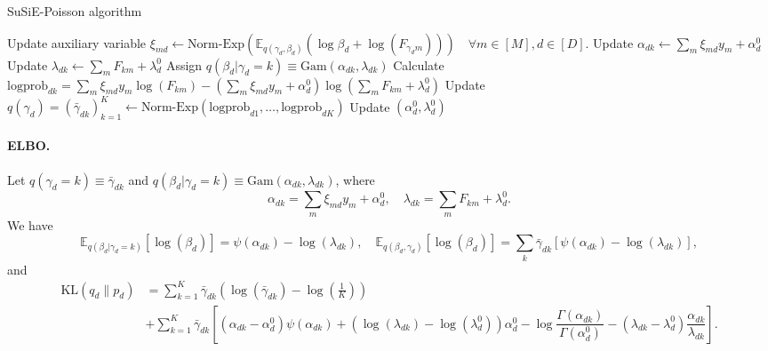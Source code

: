 \documentclass[11pt,twoside]{article}
\newcommand{\Ebb}{\ensuremath{\mathbb{E}}}
\theoremstyle{plain}
\numberwithin{theorem}{section}
\numberwithin{proposition}{section}
\numberwithin{lemma}{section}
\numberwithin{definition}{section}
\numberwithin{condition}{section}
\numberwithin{problem}{section}
\numberwithin{corollary}{section}
\numberwithin{assumption}{section}
\numberwithin{example}{section}
\numberwithin{conjecture}{section}
\theoremstyle{definition}
\numberwithin{remark}{section}
\begin{document}
\begin{algorithm}
\caption{SuSiE-Poisson algorithm}\label{alg:susie-poisson}
\begin{algorithmic}
    \State Update auxiliary variable $\xi_{md} \gets  \text{Norm-Exp}(\Ebb_{q(\gamma_{d}, \beta_{d})} (\log \beta_{d} + \log(F_{\gamma_{d}m}))) \quad \forall m\in [M], d\in [D].$ 
    \State Update $\alpha_{dk} \gets \sum_m \xi_{md} y_m + \alpha^{0}_d$ 
    \State Update $\lambda_{dk} \gets \sum_m F_{km} + \lambda^{0}_d$ 
    \State Assign $q(\beta_d | \gamma_d = k) \equiv \mathrm{Gam}(\alpha_{dk}, \lambda_{dk})$ 
    \State Calculate $\mathrm{logprob}_{dk} = \sum_m \xi_{md} y_m \log(F_{km}) - (\sum_m \xi_{md} y_m + \alpha^{0}_d)\log(\sum_{m} F_{km} + \lambda^{0}_d)$
    \State Update $q(\gamma_d) = (\bar{\gamma}_{dk})_{k=1}^{K} \gets \text{Norm-Exp}(\mathrm{logprob}_{d1}, \dots, \mathrm{logprob}_{dK}) $ 
    \State Update $(\alpha_d^0, \lambda_d^0)$ 
    
    \EndFor
    
\EndFor
\end{algorithmic}
\end{algorithm}

\paragraph{ELBO.}
Let $q(\gamma_d = k) \equiv \bar{\gamma}_{dk}$ and $q(\beta_d | \gamma_d = k) \equiv \mathrm{Gam}(\alpha_{dk}, \lambda_{dk})$, where 
$$\alpha_{dk} = \sum_{m} \xi_{md} y_{m} + \alpha_d^0, \quad \lambda_{dk} = \sum_{m} F_{km} + \lambda_d^0.$$
We have
\begin{equation}
\Ebb_{q(\beta_d | \gamma_d = k)} [\log(\beta_{d})] = \psi(\alpha_{dk}) - \log(\lambda_{dk}),  \quad \Ebb_{q(\beta_d, \gamma_d)} [\log(\beta_{d})] = \sum_k \bar{\gamma}_{dk}[\psi(\alpha_{dk}) - \log(\lambda_{dk})],  
\end{equation}
and
\begin{align}
\mathrm{KL}(q_d \| p_d) & = \sum_{k=1}^{K} \bar{\gamma}_{dk}(\log(\bar{\gamma}_{dk}) - \log(\tfrac{1}{K})) \nonumber \\
& + \sum_{k=1}^{K} \bar{\gamma}_{dk} \left[(\alpha_{dk} - \alpha_d^0) \psi(\alpha_{dk}) + (\log(\lambda_{dk}) - \log(\lambda_d^0))\alpha^0_d - \log \dfrac{\Gamma(\alpha_{dk})}{\Gamma(\alpha_{d}^0)} - (\lambda_{dk} - \lambda_d^0) \dfrac{\alpha_{dk}}{\lambda_{dk}} \right].   
\end{align}
\end{document}
